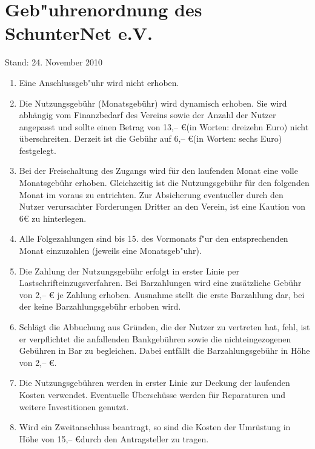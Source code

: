 

\section{Geb"uhrenordnung des SchunterNet e.V.}
\label{gebuehr}

{\small Stand: 24. November 2010}

\begin{enumerate}
\item Eine Anschlussgeb"uhr wird nicht erhoben.

\item Die Nutzungsgebühr (Monatsgebühr) wird dynamisch erhoben. Sie wird
  abhängig vom Finanzbedarf des Vereins sowie der Anzahl der Nutzer
  angepasst und sollte einen Betrag von 13,-- \euro (in Worten: dreizehn
  Euro) nicht überschreiten. Derzeit ist die Gebühr auf 6,-- \euro (in Worten: sechs Euro) festgelegt.
\item Bei der Freischaltung des Zugangs wird für den laufenden Monat eine volle Monatsgebühr erhoben. Gleichzeitig ist die Nutzungsgebühr für den folgenden Monat im voraus zu entrichten. Zur Absicherung eventueller durch den Nutzer verursachter Forderungen Dritter an den Verein, ist eine Kaution von 6€ zu hinterlegen.

\item Alle Folgezahlungen sind bis 15. des Vormonats f"ur den
  entsprechenden Monat einzuzahlen (jeweils eine Monatsgeb"uhr).

\item  
Die Zahlung der Nutzungsgebühr erfolgt in erster Linie per
Lastschrifteinzugsverfahren. Bei Barzahlungen wird eine zusätzliche
Gebühr von 2,-- € je Zahlung erhoben. Ausnahme stellt die erste
Barzahlung dar, bei der keine Barzahlungsgebühr erhoben wird.

\item Schlägt die Abbuchung aus Gründen, die der Nutzer zu vertreten hat, fehl, ist er verpflichtet die anfallenden Bankgebühren sowie die nichteingezogenen Gebühren in Bar zu begleichen. Dabei entfällt die Barzahlungsgebühr in Höhe von 2,-- \euro.
\item  Die Nutzungsgebühren werden in erster Linie zur Deckung der laufenden Kosten verwendet. Eventuelle Überschüsse werden für Reparaturen und weitere Investitionen genutzt.

\item Wird ein Zweitanschluss beantragt, so sind die Kosten der
  Umrüstung in Höhe von 15,-- \euro durch den Antragsteller zu tragen.


\end{enumerate}
